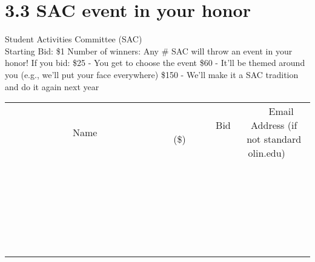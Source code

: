 \documentclass[11pt]{article}
\begin{document}
\section*{3.3 SAC event in your honor}
Student Activities Committee (SAC)
\\
Starting Bid: \$1
\newline
Number of winners: Any \#
\newline
SAC will throw an event in your honor! If you bid:
\$25 - You get to choose the event
\$60 - It'll be themed around you (e.g., we'll put your face everywhere)
\$150 - We'll make it a SAC tradition and do it again next year
\\[6ex]
\begin{tabular}{c c c}
~~~~~~~~~~~~~Name~~~~~~~~~~~~~ & ~~~~~~~~~Bid (\$)~~~~~~~~~  & ~~~Email Address (if not standard olin.edu)~~~\\
 & & \\
\hline
 & & \\
\hline
 & & \\
\hline
 & & \\
\hline
 & & \\
\hline
 & & \\
\hline
 & & \\
\hline
 & & \\
\hline
 & & \\
\hline
 & & \\
\hline
 & & \\
\hline
 & & \\
\hline
 & & \\
\hline
 & & \\
\hline
 & & \\
\hline
 & & \\
\hline
 & & \\
\hline
 & & \\
\hline
 & & \\
\hline
 & & \\
\hline
 & & \\
\hline
 & & \\
\hline
 & & \\
\hline
 & & \\
\hline
 & & \\
\hline
 & & \\
\hline
\end{tabular}
\newpage
\end{document}
